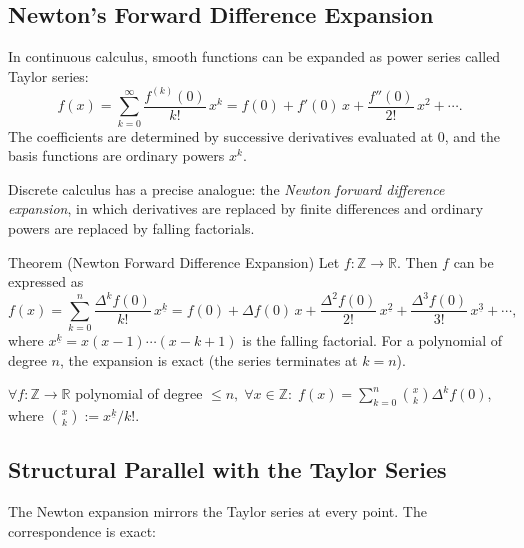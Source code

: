 
\subsection{Newton's Forward Difference Expansion}
\label{sec:newtons-expansion}

In continuous calculus, smooth functions can be expanded as power series
called Taylor series:
\[
f(x)
=
\sum_{k=0}^{\infty} \frac{f^{(k)}(0)}{k!}\, x^k
=
f(0) + f'(0)\,x + \frac{f''(0)}{2!}\,x^2 + \cdots.
\]
The coefficients are determined by successive derivatives evaluated at \(0\),
and the basis functions are ordinary powers \(x^k\).

Discrete calculus has a precise analogue: the \emph{Newton forward difference
expansion}, in which derivatives are replaced by finite differences and
ordinary powers are replaced by falling factorials.

\begin{theorembox}{Theorem (Newton Forward Difference Expansion)}
Let \(f : \mathbb{Z} \to \mathbb{R}\). Then \(f\) can be expressed as
\[
f(x)
=
\sum_{k=0}^{n} \frac{\Delta^k f(0)}{k!}\, x^{\underline{k}}
=
f(0)
+
\Delta f(0)\, x
+
\frac{\Delta^2 f(0)}{2!}\, x^{\underline{2}}
+
\frac{\Delta^3 f(0)}{3!}\, x^{\underline{3}}
+
\cdots,
\]
where \(x^{\underline{k}} = x(x-1)\cdots(x-k+1)\) is the falling factorial.
For a polynomial of degree \(n\), the expansion is exact (the series
terminates at \(k = n\)).
\end{theorembox}
\label{thm:newton-expansion}

\begin{remark*}
\(\forall f : \mathbb{Z}\to\mathbb{R}\) polynomial of degree \(\le n,\;
\forall x \in \mathbb{Z}:\;
f(x) = \displaystyle\sum_{k=0}^{n}\binom{x}{k}\Delta^k f(0)\),
where \(\binom{x}{k} := x^{\underline{k}}/k!\).
\end{remark*}

\subsection*{Structural Parallel with the Taylor Series}

The Newton expansion mirrors the Taylor series at every point. The
correspondence is exact:

